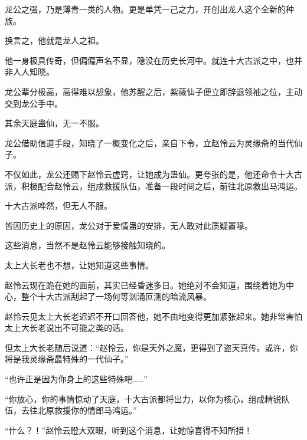 \begin{this_body}
龙公之强，乃是薄青一类的人物。更是单凭一己之力，开创出龙人这个全新的种族。

换言之，他就是龙人之祖。

他一身极具传奇，但偏偏声名不显，隐没在历史长河中。就连十大古派之中，也并非人人知晓。

龙公辈分极高，高得难以想象，他苏醒之后，紫薇仙子便立即辞退领袖之位，主动交到龙公手中。

其余天庭蛊仙，无一不服。

龙公借助信道手段，知晓了一概变化之后，亲自下令，立赵怜云为灵缘斋的当代仙子。

不仅如此，龙公还赐下赵怜云虚窍，让她成为蛊仙。更夸张的是，他还命令十大古派，积极配合赵怜云，组成救援队伍，准备一段时间之后，前往北原救出马鸿运。

十大古派哗然，但无人不服。

皆因历史上的原因，龙公对于爱情蛊的安排，无人敢对此质疑置喙。

这些消息，当然不是赵怜云能够接触知晓的。

太上大长老也不想，让她知道这些事情。

赵怜云现在跪在她的面前，其实已经昏迷多日。她绝对不会知道，围绕着她为中心，整个十大古派刮起了一场何等汹涌叵测的暗流风暴。

赵怜云见太上大长老迟迟不开口回答他，她不由地变得更加紧张起来。她非常害怕太上大长老说出不可能之类的话。

但太上大长老随后说道：“赵怜云，你是天外之魔，更得到了盗天真传。或许，你将是我灵缘斋最特殊的一代仙子。”

“也许正是因为你身上的这些特殊吧……”

“你放心，你的事情惊动了天庭，十大古派都将出力，以你为核心，组成精锐队伍，去往北原救援你的情郎马鸿运。”

“什么？！”赵怜云瞪大双眼，听到这个消息，让她惊喜得不知所措！

\end{this_body}

